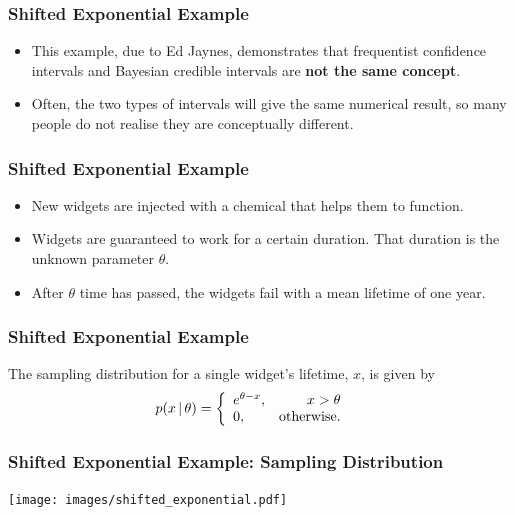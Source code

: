 \documentclass{beamer}
\newcommand{\given}{\,|\,}
\begin{document}
\begin{frame}[fragile]
\frametitle{Shifted Exponential Example}
\begin{itemize}
\item This example, due to Ed Jaynes, demonstrates that frequentist confidence intervals
and Bayesian credible intervals are {\bf not the same concept}.\pause
\item Often, the two types of intervals will give the same numerical result, so
many people do not realise they are conceptually different.
\end{itemize}

\end{frame}

\begin{frame}[fragile]
\frametitle{Shifted Exponential Example}
\begin{itemize}
\item New widgets are injected with a chemical that helps
them to function.\pause
\item Widgets are guaranteed to work for a certain duration. That duration is the
unknown parameter $\theta$.\pause
\item After $\theta$ time has passed, the widgets fail with a mean lifetime
of one year.
\end{itemize}

\end{frame}


\begin{frame}[fragile]
\frametitle{Shifted Exponential Example}
The sampling distribution for a single widget's lifetime, $x$, is given by
\begin{align}
p(x \given \theta) &= \left\{
    \begin{array}{lr}
    e^{\theta - x}, & x > \theta \\
    0,              & \textnormal{otherwise.}
    \end{array}
    \right.
\end{align}

\end{frame}


\begin{frame}[fragile]
\frametitle{Shifted Exponential Example: Sampling Distribution}
\centering
\texttt{[image: images/shifted\_exponential.pdf]}

\end{frame}
\end{document}
